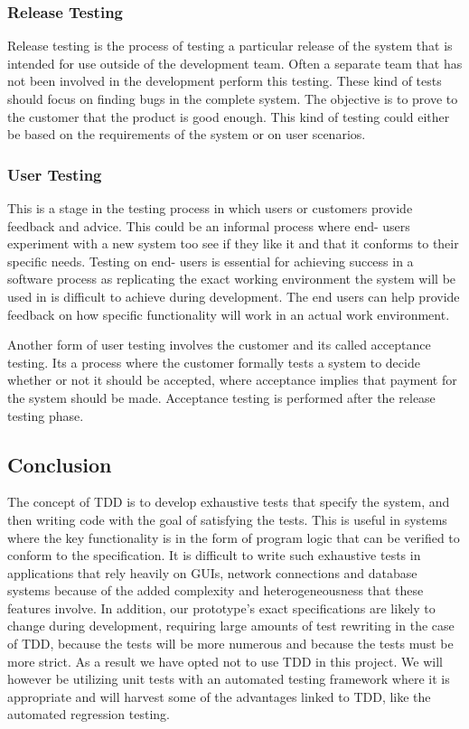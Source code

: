 \subsubsection{Release Testing}
Release testing is the process of testing a particular release of the system that is intended for use outside of the development team. Often a separate team that has not been involved in the development perform this testing. These kind of tests should focus on finding bugs in the complete system. The objective is to prove to the customer that the product is good enough. This kind of testing could either be based on the requirements of the system or on user scenarios.

\subsubsection{User Testing}
This is a stage in the testing process in which users or customers provide feedback and advice. This could be an informal process where end- users experiment with a new system too see if they like it and that it conforms to their specific needs. Testing on end- users is essential for achieving success in a software process as replicating the exact working environment the system will be used in is difficult to achieve during development. The end users can help provide feedback on how specific functionality will work in an actual work environment.

Another form of user testing involves the customer and its called acceptance testing. Its a process where the customer formally tests a system to decide whether or not it should be accepted, where acceptance implies that payment for the system should be made. Acceptance testing is performed after the release testing phase.

\subsection{Conclusion}
The concept of TDD is to develop exhaustive tests that specify the system, and then writing code with the goal of satisfying the tests. This is useful in systems where the key functionality is in the form of program logic that can be verified to conform to the specification. It is difficult to write such exhaustive tests in applications that rely heavily on GUIs, network connections and database systems because of the added complexity and heterogeneousness that these features involve. In addition, our prototype's exact specifications are likely to change during development, requiring large amounts of test rewriting in the case of TDD, because the tests will be more numerous and because the tests must be more strict. As a result we have opted not to use TDD in this project. We will however be utilizing unit tests with an automated testing framework where it is appropriate and will harvest some of the advantages linked to TDD, like the automated regression testing.

